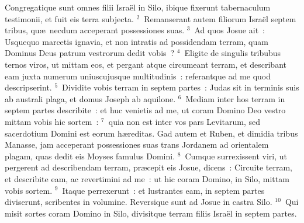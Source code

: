 \lettrine[lines=3,image=true,loversize=0.05,lraise=-0.03]{C}{}ongregatique sunt omnes filii Isra\"el in Silo, ibique fixerunt tabernaculum testimonii, et fuit eis terra subjecta.
${}^{2}$~Remanserant autem filiorum Isra\"el septem tribus, qu\ae\ necdum acceperant possessiones suas.
${}^{3}$~Ad quos Josue ait~: Usquequo marcetis ignavia, et non intratis ad possidendam terram, quam Dominus Deus patrum vestrorum dedit vobis~?
${}^{4}$~Eligite de singulis tribubus ternos viros, ut mittam eos, et pergant atque circumeant terram, et describant eam juxta numerum uniuscujusque multitudinis~: referantque ad me quod descripserint.
${}^{5}$~Dividite vobis terram in septem partes~: Judas sit in terminis suis ab australi plaga, et domus Joseph ab aquilone.
${}^{6}$~Mediam inter hos terram in septem partes describite~: et huc venietis ad me, ut coram Domino Deo vestro mittam vobis hic sortem~:
${}^{7}$~quia non est inter vos pars Levitarum, sed sacerdotium Domini est eorum h\ae reditas. Gad autem et Ruben, et dimidia tribus Manasse, jam acceperant possessiones suas trans Jordanem ad orientalem plagam, quas dedit eis Moyses famulus Domini.
${}^{8}$~Cumque surrexissent viri, ut pergerent ad describendam terram, pr\ae cepit eis Josue, dicens~: Circuite terram, et describite eam, ac revertimini ad me~: ut hic coram Domino, in Silo, mittam vobis sortem.
${}^{9}$~Itaque perrexerunt~: et lustrantes eam, in septem partes diviserunt, scribentes in volumine. Reversique sunt ad Josue in castra Silo.
${}^{10}$~Qui misit sortes coram Domino in Silo, divisitque terram filiis Isra\"el in septem partes.


